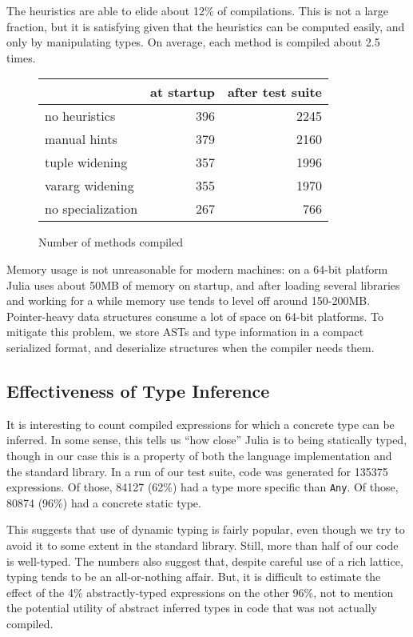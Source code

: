 \documentclass[9pt]{sigplanconf}
\begin{document}
The heuristics are able to elide about 12\% of compilations. This is
not a large fraction, but it is satisfying given that the heuristics can
be computed easily, and only by manipulating types. On average, each
method is compiled about 2.5 times.

\begin{figure}
\caption{Number of methods compiled}
\label{ncomp}
\begin{center}
\begin{tabular}{|l|r|r|}\hline
    & at startup & after test suite \\
\hline \hline
no heuristics & 396 & 2245 \\
\hline
manual hints & 379 & 2160 \\
\hline
tuple widening & 357 & 1996 \\
\hline
vararg widening & 355 & 1970 \\
\hline
no specialization & 267 & 766 \\
\hline
\end{tabular}
\end{center}
\end{figure}

Memory usage is not unreasonable for modern machines: on a 64-bit platform
Julia uses about 50MB of memory on startup, and after loading several
libraries and working for a while memory use tends to level off around
150-200MB. Pointer-heavy data structures consume a lot of space on
64-bit platforms. To mitigate this problem, we store ASTs and type
information in a compact serialized format, and deserialize structures
when the compiler needs them.


\subsection{Effectiveness of Type Inference}

It is interesting to count compiled expressions for which
a concrete type can be inferred. In some sense, this tells us ``how close''
Julia is to being statically typed, though in our case this is a property
of both the language implementation and the standard library.
In a run of our test suite, code was generated for 135375 expressions.
Of those, 84127 (62\%) had a type more specific than {\tt Any}. Of those,
80874 (96\%) had a concrete static type.

This suggests that use of dynamic typing is fairly popular, even though
we try to avoid it to some extent in the standard library. Still, more
than half of our code is well-typed. The numbers also suggest that,
despite careful use of a rich lattice, typing tends to be an all-or-nothing
affair. But, it is difficult to estimate the effect of the 4\%
abstractly-typed expressions on the other 96\%, not to mention the potential
utility of abstract inferred types in code that was not actually
compiled.
\end{document}
